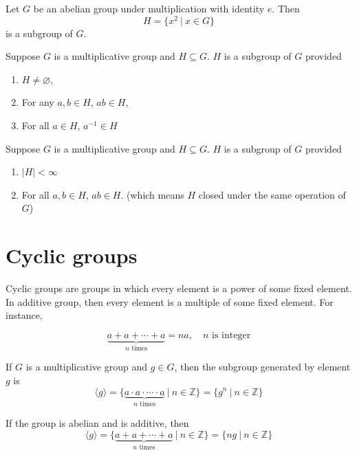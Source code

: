 \begin{example}
    Let $G$ be an abelian group under multiplication with identity $e$. Then 
    \[
        H = \{ x^2  \> | \> x \in G \}
    \]
    is a subgroup of $G$.
\end{example}

\begin{theorem}
    Suppose $G$ is a multiplicative group and $H \subseteq G$. 
    $H$ is a subgroup of $G$ provided 
    \begin{enumerate}
        \item $H \neq \varnothing$,
        \item For any $a, b \in H$, $ab \in H$,
        \item For all $a \in H$, $a^{-1} \in H$
    \end{enumerate}
\end{theorem}

\begin{theorem}
    Suppose $G$ is a multiplicative group and $H \subseteq G$. $H$ is a subgroup of $G$ provided 
    \begin{enumerate}
        \item $|H| < \infty$
        \item For all $a,b\in H$, $ab\in H$. (which means $H$ closed under the same operation of $G$)
    \end{enumerate}
\end{theorem}


\section{Cyclic groups}

Cyclic groups are groups in which every element is a power of some fixed element. In additive group, then every 
element is a multiple of some fixed element. For instance,

\[
    \underbrace{a + a + \cdots + a}_{n \text{ times}} = na, \quad n \text{ is integer}
\]

\begin{definition}
    If $G$ is a multiplicative group and $g \in G$, then the subgroup generated by element $g$ is 
    \begin{equation}
        \langle g \rangle = \{ \underbrace{a \cdot a \cdot \cdots \cdot a}_{n \text{ times}} \> | \> n \in \mathbb{Z} \} = \{ g^n \> | \> n \in \mathbb{Z} \}
    \end{equation}

    If the group is abelian and is additive, then 
    \begin{equation}
        \langle g \rangle = \{ \underbrace{a + a + \cdots + a}_{n \text{ times}} \> | \> n \in \mathbb{Z} \}= \{ ng \> | \> n \in \mathbb{Z} \}
    \end{equation}
\end{definition}

